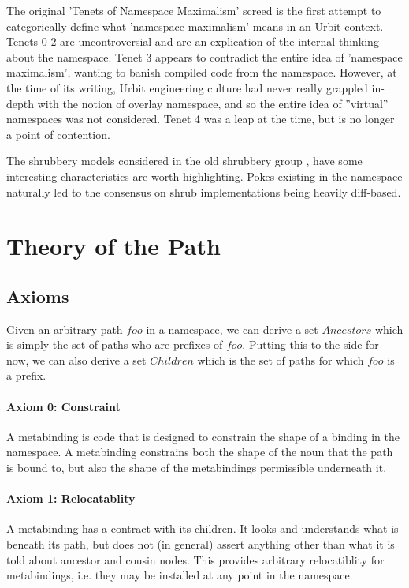 \documentclass[twoside]{report}
\begin{document}
The original 'Tenets of Namespace Maximalism' \citep{NamespaceTenets} screed is the first attempt to categorically define what 'namespace maximalism' means in an Urbit context. Tenets 0-2 are uncontroversial and are an explication of the internal thinking about the namespace. Tenet 3 appears to contradict the entire idea of 'namespace maximalism', wanting to banish compiled code from the namespace. However, at the time of its writing, Urbit engineering culture had never really grappled in-depth with the notion of overlay namespace, and so the entire idea of ''virtual'' namespaces was not considered. Tenet 4 was a leap at the time, but is no longer a point of contention.


The shrubbery models considered in the old shrubbery group \citep{ShrubGroup}, have some interesting characteristics are worth highlighting. Pokes existing in the namespace naturally led to the consensus on shrub implementations being heavily diff-based.

\section{Theory of the Path}

\subsection{Axioms}

Given an arbitrary path $\mathit{foo}$ in a namespace, we can derive a set $\mathit{Ancestors}$ which is simply the set of paths who are prefixes of $\mathit{foo}$. Putting this to the side for now, we can also derive a set $\mathit{Children}$ which is the set of paths for which $\mathit{foo}$ is a prefix.

\paragraph{Axiom 0: Constraint}

A metabinding is code that is designed to constrain the shape of a binding in the namespace. A metabinding constrains both the shape of the noun that the path is bound to, but also the shape of the metabindings permissible underneath it.

\paragraph{Axiom 1: Relocatablity}

A metabinding has a contract with its children. It looks and understands what is beneath its path, but does not (in general) assert anything other than what it is told about ancestor and cousin nodes. This provides arbitrary relocatiblity for metabindings, i.e. they may be installed at any point in the namespace.
\end{document}

